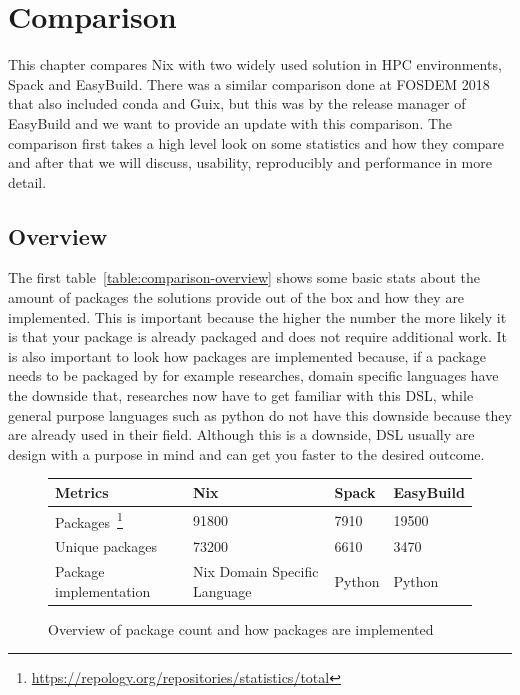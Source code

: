 \documentclass{eceasst}
\begin{document}
\section{Comparison}

This chapter compares Nix with two widely used solution in HPC environments, Spack and EasyBuild.
There was a similar comparison done at FOSDEM 2018~\cite{comparision-fosdem} that also included conda and Guix, but this was by the release manager of EasyBuild and we want to provide an update with this comparison.
The comparison first takes a high level look on some statistics and how they compare and after that we will discuss, usability, reproducibly and performance in more detail.

\subsection{Overview}

The first table~\ref{table:comparison-overview} shows some basic stats about the amount of packages the solutions provide out of the box and how they are implemented.
This is important because the higher the number the more likely it is that your package is already packaged and does not require additional work.
It is also important to look how packages are implemented because, if a package needs to be packaged by for example researches, domain specific languages have the downside that, researches now have to get familiar with this DSL, while general purpose languages such as python do not have this downside because they are already used in their field.
Although this is a downside, DSL usually are design with a purpose in mind and can get you faster to the desired outcome.

\begin{figure}
  \normalsize
  \caption{Overview of package count and how packages are implemented}
  \label{table:comparison-overview}
  \centering
  \begin{tabular}{|p{2cm}|p{3.5cm}|p{3.5cm}|p{3.5cm}|}
    \hline
    \textbf{Metrics} & \textbf{Nix} & \textbf{Spack} & \textbf{EasyBuild} \\ \hline
    Packages~\footnote{\label{foot:repology}\url{https://repology.org/repositories/statistics/total}} & 91800 & 7910 & 19500 \\ \hline
    Unique packages & 73200 & 6610 & 3470 \\ \hline
    Package implementation & Nix Domain Specific Language & Python & Python \\ \hline
  \end{tabular}
\end{figure}
\end{document}
